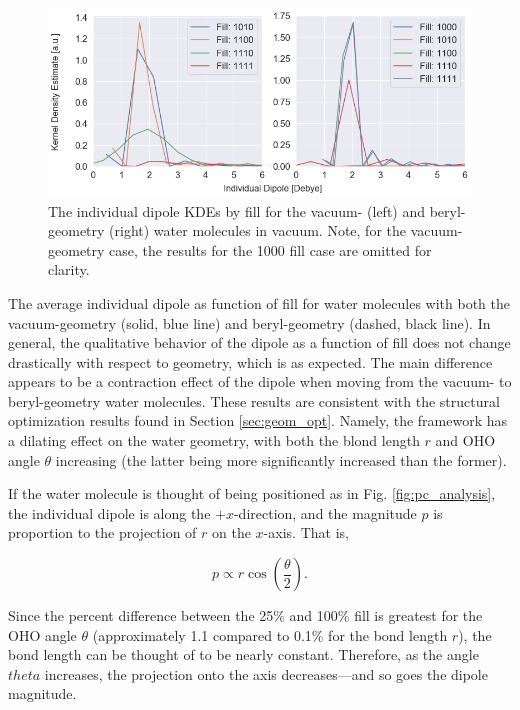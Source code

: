         \begin{figure}
            \centering
            \includegraphics[width=0.9\linewidth]{Figures/System/pc_vacuum_compare_kde.png}
            \caption{The individual dipole KDEs by fill for the vacuum- (left) and beryl-geometry (right) water molecules in vacuum. Note, for the vacuum-geometry case, the results for the 1000 fill case are omitted for clarity.}
            \label{fig:pc_vacuum_kde}
        \end{figure}
            
        The average individual dipole as function of fill for water molecules with both the vacuum-geometry (solid, blue line) and beryl-geometry (dashed, black line). In general, the qualitative behavior of the dipole as a function of fill does not change drastically with respect to geometry, which is as expected. The main difference appears to be a contraction effect of the dipole when moving from the vacuum- to beryl-geometry water molecules. These results are consistent with the structural optimization results found in Section \ref{sec:geom_opt}. Namely, the framework has a dilating effect on the water geometry, with both the blond length $r$ and OHO angle $\theta$ increasing (the latter being more significantly increased than the former). 
        
        If the water molecule is thought of being positioned as in Fig. \ref{fig:pc_analysis}, the individual dipole is along the $+x$-direction, and the magnitude $p$ is proportion to the projection of $r$ on the $x$-axis. That is, 
        
        \begin{equation}
            p \propto r \cos\left(\frac{\theta}{2}\right).
        \end{equation}
        
        \noindent Since the percent difference between the 25\% and 100\% fill is greatest for the OHO angle $\theta$ (approximately 1.1\5 compared to 0.1\% for the bond length $r$), the bond length can be thought of to be nearly constant. Therefore, as the angle $theta$ increases, the projection onto the axis decreases---and so goes the dipole magnitude.
        
